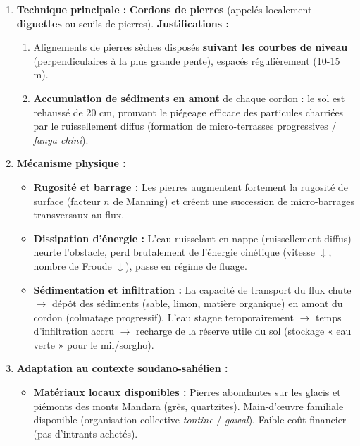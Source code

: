 \documentclass[11pt]{article}
\begin{document}
\begin{corrige}
\begin{enumerate}
    \item \textbf{Technique principale :} \textbf{Cordons de pierres} (appelés localement \textbf{diguettes} ou seuils de pierres).
    \textbf{Justifications :}
    \begin{enumerate}
        \item Alignements de pierres sèches disposés \textbf{suivant les courbes de niveau} (perpendiculaires à la plus grande pente), espacés régulièrement (10-15 m).
        \item \textbf{Accumulation de sédiments en amont} de chaque cordon : le sol est rehaussé de 20 cm, prouvant le piégeage efficace des particules charriées par le ruissellement diffus (formation de micro-terrasses progressives / \textit{fanya chini}).
    \end{enumerate}
    \item \textbf{Mécanisme physique :}
    \begin{itemize}
        \item \textbf{Rugosité et barrage :} Les pierres augmentent fortement la rugosité de surface (facteur $n$ de Manning) et créent une succession de micro-barrages transversaux au flux.
        \item \textbf{Dissipation d'énergie :} L'eau ruisselant en nappe (ruissellement diffus) heurte l'obstacle, perd brutalement de l'énergie cinétique (vitesse $\downarrow$, nombre de Froude $\downarrow$), passe en régime de fluage.
        \item \textbf{Sédimentation et infiltration :} La capacité de transport du flux chute $\rightarrow$ dépôt des sédiments (sable, limon, matière organique) en amont du cordon (colmatage progressif). L'eau stagne temporairement $\rightarrow$ temps d'infiltration accru $\rightarrow$ recharge de la réserve utile du sol (stockage « eau verte » pour le mil/sorgho).
    \end{itemize}
    \item \textbf{Adaptation au contexte soudano-sahélien :}
    \begin{itemize}
        \item \textbf{Matériaux locaux disponibles :} Pierres abondantes sur les glacis et piémonts des monts Mandara (grès, quartzites). Main-d'œuvre familiale disponible (organisation collective \emph{tontine} / \emph{gawal}). Faible coût financier (pas d'intrants achetés).

\end{itemize}
\end{enumerate}
\end{corrige}
\end{document}
